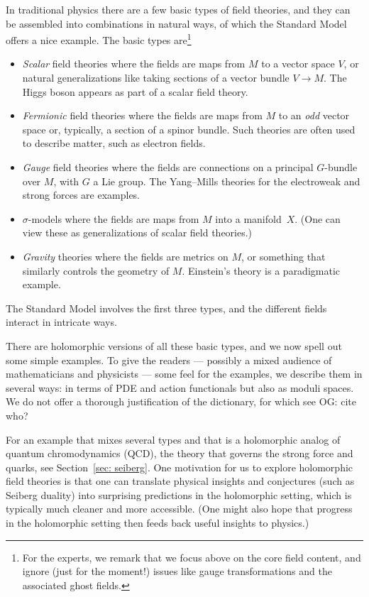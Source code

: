 \documentclass[11pt]{amsart}
\def\owen#1{{\textcolor{violet!65!black}{OG: {#1}}}}
\begin{document}
In traditional physics there are a few basic types of field theories, 
and they can be assembled into combinations in natural ways,
of which the Standard Model offers a nice example.
The basic types are\footnote{For the experts, we remark that we focus above on the core field content, and ignore (just for the moment!) issues like gauge transformations and the associated ghost fields.}
\begin{itemize}
\item {\em Scalar} field theories where the fields are maps from $M$ to a vector space $V$, or natural generalizations like taking sections of a vector bundle $V \to M$. The Higgs boson appears as part of a scalar field theory.
\item {\em Fermionic} field theories where the fields are maps from $M$ to an {\em odd} vector space or, typically, a section of a spinor bundle. Such theories are often used to describe matter, such as electron fields.
\item {\em Gauge} field theories where the fields are connections on a principal $G$-bundle over $M$, with $G$ a Lie group. The Yang--Mills theories for the electroweak and strong forces are examples.
\item $\sigma$-models where the fields are maps from $M$ into a manifold~$X$. (One can view these as generalizations of scalar field theories.)
\item {\em Gravity} theories where the fields are metrics on $M$, or something that similarly controls the geometry of $M$. Einstein's theory is a paradigmatic example.
\end{itemize}
The Standard Model involves the first three types,
and the different fields interact in intricate ways.

There are holomorphic versions of all these basic types, 
and we now spell out some simple examples.
To give the readers --- possibly a mixed audience of mathematicians and physicists --- some feel for the examples, 
we describe them in several ways: 
in terms of PDE and action functionals but also as moduli spaces.
We do not offer a thorough justification of the dictionary, for which see \owen{cite who?}

For an example that mixes several types and that is a holomorphic analog of quantum chromodynamics (QCD), the theory that governs the strong force and quarks,
see Section~\ref{sec: seiberg}.
One motivation for us to explore holomorphic field theories is that one can translate physical insights and conjectures (such as Seiberg duality) into surprising predictions in the holomorphic setting,
which is typically much cleaner and more accessible.
(One might also hope that progress in the holomorphic setting then feeds back useful insights to physics.)
\end{document}
